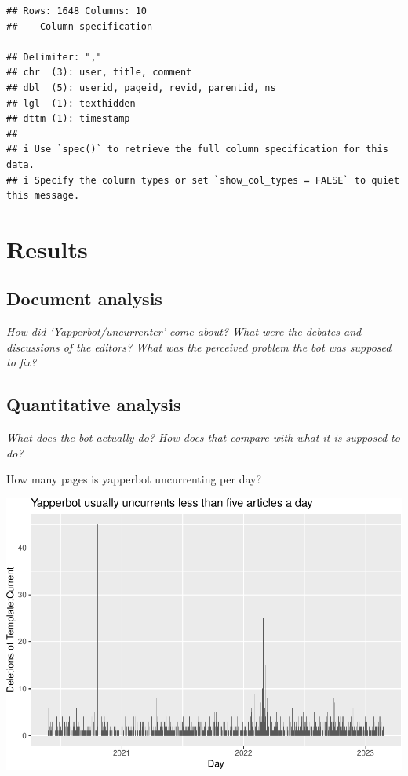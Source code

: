 \documentclass[Royal,times,sageh]{sagej}
\begin{document}
\begin{verbatim}
## Rows: 1648 Columns: 10
## -- Column specification --------------------------------------------------------
## Delimiter: ","
## chr  (3): user, title, comment
## dbl  (5): userid, pageid, revid, parentid, ns
## lgl  (1): texthidden
## dttm (1): timestamp
## 
## i Use `spec()` to retrieve the full column specification for this data.
## i Specify the column types or set `show_col_types = FALSE` to quiet this message.
\end{verbatim}

\hypertarget{results}{%
\section{Results}\label{results}}

\hypertarget{document-analysis}{%
\subsection{Document analysis}\label{document-analysis}}

\emph{How did `Yapperbot/uncurrenter' come about? What were the debates
and discussions of the editors? What was the perceived problem the bot
was supposed to fix?}

\hypertarget{quantitative-analysis}{%
\subsection{Quantitative analysis}\label{quantitative-analysis}}

\emph{What does the bot actually do? How does that compare with what it
is supposed to do?}

How many pages is yapperbot uncurrenting per day?

\includegraphics[width=1\linewidth]{the-bot-that-makes-history_files/figure-latex/unnamed-chunk-3-1}
\end{document}
